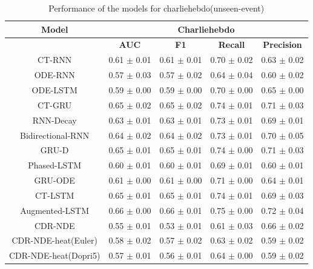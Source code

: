 \documentclass{article} %
\begin{document}
\begin{table}
        \begin{center}
               \begin{tabular}{|c|c|c|c|c|}
                        \hline
                        {\small \textbf{Model}}  & \multicolumn{4}{c|}{\textbf{Charliehebdo} } \\
                        \hline
                         & \textbf{AUC }& \textbf{F1} & \textbf{Recall} & \textbf{Precision} \\
                         \hline
                        CT-RNN & 0.61 $\pm$ 0.01 & 0.61 $\pm$ 0.01 & 0.70 $\pm$ 0.02 & 0.63 $\pm$ 0.02 \\
                        ODE-RNN & 0.57 $\pm$ 0.03 & 0.57 $\pm$ 0.02 & 0.64 $\pm$ 0.04 & 0.60 $\pm$ 0.02 \\
                        ODE-LSTM & 0.59 $\pm$ 0.00 & 0.59 $\pm$ 0.00 & 0.70 $\pm$ 0.00 & 0.65 $\pm$ 0.00 \\
                        CT-GRU & 0.65 $\pm$ 0.02 & 0.65 $\pm$ 0.02 & 0.74 $\pm$ 0.01 & 0.71 $\pm$ 0.03 \\
                        RNN-Decay & 0.63 $\pm$ 0.01 & 0.63 $\pm$ 0.01 & 0.73 $\pm$ 0.01 & 0.69 $\pm$ 0.01 \\
                        Bidirectional-RNN & 0.64 $\pm$ 0.02 & 0.64 $\pm$ 0.02 & 0.73 $\pm$ 0.01 & 0.70 $\pm$ 0.05 \\
                        GRU-D & 0.65 $\pm$ 0.01 & 0.65 $\pm$ 0.01 & 0.74 $\pm$ 0.00 & 0.71 $\pm$ 0.03 \\
                        Phased-LSTM & 0.60 $\pm$ 0.01 & 0.60 $\pm$ 0.01 & 0.69 $\pm$ 0.01 & 0.60 $\pm$ 0.01 \\
                        GRU-ODE & 0.61 $\pm$ 0.00 & 0.61 $\pm$ 0.00 & 0.71 $\pm$ 0.00 & 0.64 $\pm$ 0.01 \\
                        CT-LSTM & 0.65 $\pm$ 0.01 & 0.65 $\pm$ 0.01 & 0.74 $\pm$ 0.01 & 0.69 $\pm$ 0.03 \\
                        Augmented-LSTM & 0.66 $\pm$ 0.00 & 0.66 $\pm$ 0.01 & 0.75 $\pm$ 0.00 & 0.72 $\pm$ 0.04 \\
                        \hline
                        CDR-NDE & 0.55 $\pm$ 0.01 & 0.53 $\pm$ 0.01 & 0.61 $\pm$ 0.03 & 0.66 $\pm$ 0.02 \\
CDR-NDE-heat(Euler) & 0.58 $\pm$ 0.02 & 0.57 $\pm$ 0.02 & 0.63 $\pm$ 0.02 & 0.59 $\pm$ 0.02 \\ 
CDR-NDE-heat(Dopri5) & 0.57 $\pm$ 0.01 & 0.56 $\pm$ 0.01 & 0.64 $\pm$ 0.00 & 0.59 $\pm$ 0.02 \\ \hline 
                \end{tabular}
        \end{center}
        \caption{Performance of the models for charliehebdo(unseen-event)}
        \label{tab:Charliehebdo_unseen}
\end{table}
\end{document}

